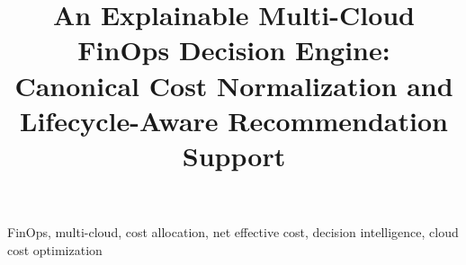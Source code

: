\documentclass[conference]{IEEEtran}
\title{An Explainable Multi-Cloud FinOps Decision Engine: \\
Canonical Cost Normalization and Lifecycle-Aware Recommendation Support}
\author{
\IEEEauthorblockN{Keerthi Rapolu \and Rishika Naha}
\IEEEauthorblockA{
\textit{Independent Research}
}
}
\begin{document}
\maketitle

\begin{abstract}

\end{abstract}

\begin{IEEEkeywords}
FinOps, multi-cloud, cost allocation, net effective cost, decision intelligence, cloud cost optimization
\end{IEEEkeywords}












\end{document}
